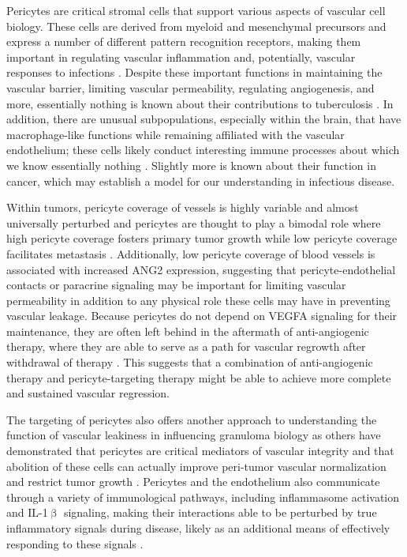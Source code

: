 Pericytes are critical stromal cells that support various aspects of vascular cell biology. These cells are derived from myeloid and mesenchymal precursors and express a number of different pattern recognition receptors, making them important in regulating vascular inflammation and, potentially, vascular responses to infections \citep{Yamazaki2018, Stark2013}. Despite these important functions in maintaining the vascular barrier, limiting vascular permeability, regulating angiogenesis, and more, essentially nothing is known about their contributions to tuberculosis \citep{Bergers2005}. In addition, there are unusual subpopulations, especially within the brain, that have macrophage\hyp{}like functions while remaining affiliated with the vascular endothelium; these cells likely conduct interesting immune processes about which we know essentially nothing \citep{VeneroGalanternik2017, Balabanov1996}. Slightly more is known about their function in cancer, which may establish a model for our understanding in infectious disease.

Within tumors, pericyte coverage of vessels is highly variable and almost universally perturbed and pericytes are thought to play a bimodal role where high pericyte coverage fosters primary tumor growth while low pericyte coverage facilitates metastasis \citep{Ribeiro2015, Saharinen2017}. Additionally, low pericyte coverage of blood vessels is associated with increased ANG2 expression, suggesting that pericyte\hyp{}endothelial contacts or paracrine signaling may be important for limiting vascular permeability in addition to any physical role these cells may have in preventing vascular leakage. Because pericytes do not depend on VEGFA signaling for their maintenance, they are often left behind in the aftermath of anti\hyp{}angiogenic therapy, where they are able to serve as a path for vascular regrowth after withdrawal of therapy \citep{Keskin2015, Ribeiro2015}. This suggests that a combination of anti\hyp{}angiogenic therapy and pericyte\hyp{}targeting therapy might be able to achieve more complete and sustained vascular regression. 

The targeting of pericytes also offers another approach to understanding the function of vascular leakiness in influencing granuloma biology as others have demonstrated that pericytes are critical mediators of vascular integrity and that abolition of these cells can actually improve peri\hyp{}tumor vascular normalization and restrict tumor growth \citep{Keskin2015}. Pericytes and the endothelium also communicate through a variety of immunological pathways, including inflammasome activation and IL\hyp{}1$\upbeta$ signaling, making their interactions able to be perturbed by true inflammatory signals during disease, likely as an additional means of effectively responding to these signals \citep{Kozma2021}.

